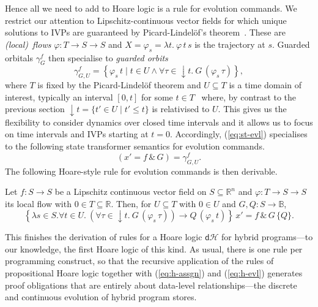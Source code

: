 \documentclass[envcountsame,envcountsect]{llncs}
\newcommand{\dH}{\mathsf{d}\mathcal{H}}
\newcommand{\flow}{\varphi}
\newcommand{\reals}{\mathbb{R}}
\newcommand{\bools}{\mathbb{B}}
\begin{document}
Hence all we need to add to Hoare logic is a rule for evolution
commands.  We restrict our attention to Lipschitz-continuous vector
fields for which unique solutions to IVPs are guaranteed by
Picard-Lindel\"of's theorem~\cite{Teschl12}. 
These are \emph{(local)\
  flows} $\flow:T\to S\to S$ and $X=\flow_s=\lambda t.\ \flow\, t\, s$
is the trajectory at $s$. Guarded orbitals $\gamma^f_G$ then
specialise to \emph{guarded orbits}
\begin{equation*}
  \gamma^f_{G,U} = \left\{\flow_s\, t\mid t\in U\land \forall\tau \in
  {\downarrow}t.\ G\, (\flow_s\, \tau)\right\},
\end{equation*}
where $T$ is fixed by the Picard-Lindel\"of theorem and $U\subseteq T$
is a time domain of interest, typically an interval $[0,t]$ for some
$t\in T$~\cite{MuniveS19} where, by contrast to the previous section
${\downarrow}t=\{t'\in U\mid t'\leq t\}$ is relativised to $U$. This
gives us the flexibility to consider dynamics over closed time
intervals and it allows us to focus on time intervals and IVPs
starting at $t=0$. Accordingly, (\ref{eq:st-evl}) specialises to the
following state transformer semantics for evolution commands.
\begin{equation}
  \left(x' = f\, \&\, G\right)= \gamma^f_{G,U}.\label{eq:st-evl-flow}\tag{st-evl-flow}
\end{equation}
The following Hoare-style rule for evolution commands is then
derivable.
\begin{lemma}\label{P:h-evl-lemma}
  Let $f:S\to S$ be a Lipschitz continuous vector field on
  $S\subseteq \reals^n$ and $\flow:T\to S\to S$ its local flow with
  $0\in T\subseteq \reals$. Then, for $U\subseteq T$ with $0\in U$ and
  $G,Q:S\to\bools$,
\begin{equation}
\left\{\lambda s\in S.\forall t\in U.\ \left(\forall
\tau\in {\downarrow}t.\ G\, (\flow_s\, \tau)\right) \rightarrow Q\,
(\flow_s\, t)\right\}\, x' = f\, \&\, G\, \{Q\}. \label{eq:h-evl}\tag{h-evl}
\end{equation}
\end{lemma}

This finishes the derivation of rules for a Hoare logic $\dH$ for
hybrid programs---to our knowledge, the first Hoare logic of this
kind. As usual, there is one rule per programming construct, so that
the recursive application of the rules of propositional Hoare logic
together with (\ref{eq:h-assgn}) and (\ref{eq:h-evl}) generates proof
obligations that are entirely about data-level relationships---the
discrete and continuous evolution of hybrid program stores.
\end{document}

